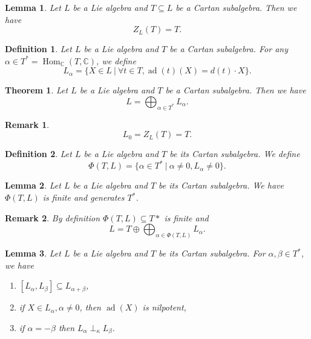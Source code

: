 \documentclass{article}
\newtheorem{theorem}{Theorem}[section]
\newtheorem{definition}{Definition}[section]
\newtheorem{lemma}{Lemma}[section]
\newtheorem{remark}{Remark}[section]
\numberwithin{equation}{section}
\DeclareMathOperator{\Hom}{Hom}
\DeclareMathOperator{\ad}{ad}
\begin{document}
\begin{lemma}
Let $L$ be a Lie algebra and $T\subseteq L$ be a Cartan subalgebra. Then we have
\begin{equation*}
Z_L(T) = T.
\end{equation*}
\end{lemma}

\begin{definition}
Let $L$ be a Lie algebra and $T$ be a Cartan subalgebra. For any $\alpha\in T^* = \Hom_{\mathbb{C}}(T,\mathbb{C})$, we define
\begin{equation*}
L_\alpha = \{X\in L\:|\: \forall t\in T, \ad(t)(X)=d(t)\cdot X\}.
\end{equation*}
\end{definition}

\begin{theorem}
Let $L$ be a Lie algebra and $T$ be a Cartan subalgebra. Then we have
\begin{equation*}
L = \bigoplus_{\alpha\in T^*} L_\alpha.
\end{equation*}
\end{theorem}

\begin{remark}
\begin{equation*}
L_0 = Z_L(T) = T.
\end{equation*}
\end{remark}

\begin{definition}
Let $L$ be a Lie algebra and $T$ be its Cartan subalgebra. We define
\begin{equation*}
\Phi(T,L) = \{\alpha\in T^*\:|\: \alpha\not=0, L_\alpha\not=0\}.
\end{equation*}
\end{definition}

\begin{lemma}
Let $L$ be a Lie algebra and $T$ be its Cartan subalgebra. We have $\Phi(T,L)$ is finite and generates $T^*$.
\end{lemma}

\begin{remark}
By definition $\Phi(T,L)\subseteq T*$ is finite and 
\begin{equation*}
L= T\oplus\bigoplus_{\alpha\in\Phi(T,L)}L_\alpha.
\end{equation*}
\end{remark}

\begin{lemma}
Let $L$ be a Lie algebra and $T$ be its Cartan subalgebra. For $\alpha,\beta\in T^*$, we have
\begin{enumerate}
\item $[L_\alpha,L_\beta]\subseteq L_{\alpha+\beta}$,
\item if $X\in L_\alpha, \alpha\not=0$, then $\ad(X)$ is nilpotent,
\item if $\alpha=-\beta$ then $L_\alpha\perp_{\kappa} L_\beta$.
\end{enumerate}
\end{lemma}
\end{document}
